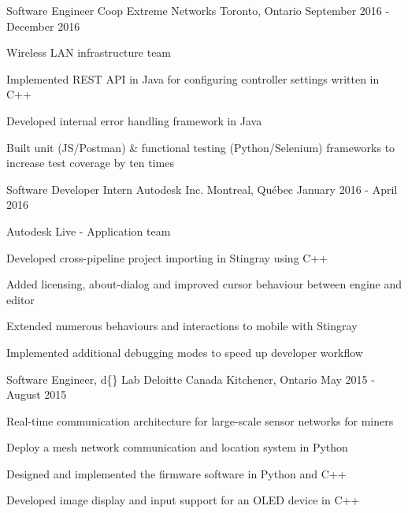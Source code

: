 


\begin{cventries}


\cventry
{Software Engineer Coop}
{Extreme Networks}
{Toronto, Ontario}
{September 2016 - December 2016}
{ %
Wireless LAN infrastructure team
\begin{cvitems}
\item[]
\item {Implemented REST API in Java for configuring controller settings written in C++}
\item {Developed internal error handling framework in Java}
\item {Built unit (JS/Postman) \& functional testing (Python/Selenium) frameworks to increase test coverage by ten times}
\end{cvitems}
}


\cventry
{Software Developer Intern}
{Autodesk Inc.}
{Montreal, Québec}
{January 2016 - April 2016}
{ %
Autodesk Live - Application team
\begin{cvitems}
\item[]
\item {Developed cross-pipeline project importing in Stingray using C++}
\item {Added licensing, about-dialog and improved cursor behaviour between engine and editor}
\item {Extended numerous behaviours and interactions to mobile with Stingray}
\item {Implemented additional debugging modes to speed up developer workflow}
\end{cvitems}
}


\cventry
{Software Engineer, d\{\} Lab}
{Deloitte Canada} %
{Kitchener, Ontario} %
{May 2015 - August 2015} %
{
Real-time communication architecture for large-scale sensor networks for miners
\begin{cvitems}
\item[]
\item {Deploy a mesh network communication and location system in Python}
\item {Designed and implemented the firmware software in Python and C++}
\item {Developed image display and input support for an OLED device in C++}
\end{cvitems}
}


\end{cventries}
